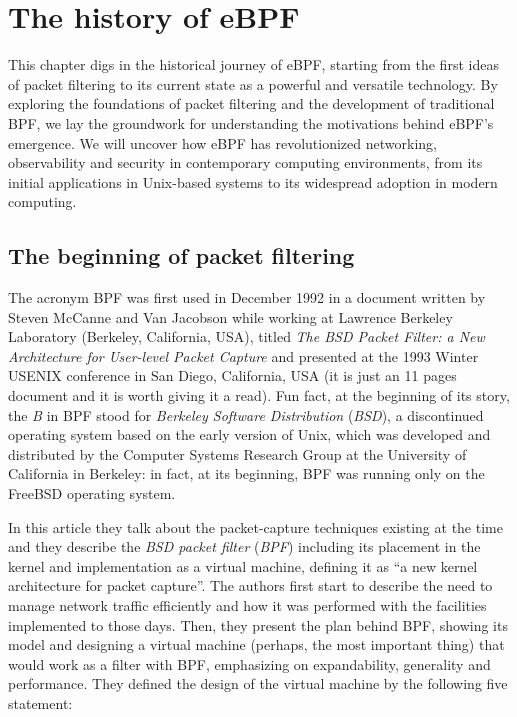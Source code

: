 \chapter{The history of eBPF}

This chapter digs in the historical journey of eBPF, starting from the first ideas of packet filtering to its current state as a powerful and versatile technology. 
By exploring the foundations of packet filtering and the development of traditional BPF, we lay the groundwork for understanding the motivations behind eBPF's emergence. 
We will uncover how eBPF has revolutionized networking, observability and security in contemporary computing environments, from its initial applications in Unix-based systems to its widespread adoption in modern computing.

\section{The beginning of packet filtering}

The acronym BPF was first used in December 1992 in a document written by Steven McCanne and Van Jacobson while working at Lawrence Berkeley Laboratory (Berkeley, California, USA), titled \textit{The BSD Packet Filter: a New Architecture for User-level Packet Capture} \cite{BSDPacketFilter} and presented at the 1993 Winter USENIX conference in San Diego, California, USA (it is just an 11 pages document and it is worth giving it a read).
Fun fact, at the beginning of its story, the \textit{B} in BPF stood for \textit{Berkeley Software Distribution} (\textit{BSD}), a discontinued operating system based on the early version of Unix, which was developed and distributed by the Computer Systems Research Group at the University of California in Berkeley: in fact, at its beginning, BPF was running only on the FreeBSD operating system.

In this article they talk about the packet-capture techniques existing at the time and they describe the \textit{BSD packet filter} (\textit{BPF}) including its placement in the kernel and implementation as a virtual machine, defining it as ``a new kernel architecture for packet capture''.
The authors first start to describe the need to manage network traffic efficiently and how it was performed with the facilities implemented to those days.
Then, they present the plan behind BPF, showing its model and designing a virtual machine (perhaps, the most important thing) that would work as a filter with BPF, emphasizing on expandability, generality and performance.
They defined the design of the virtual machine by the following five statement:

